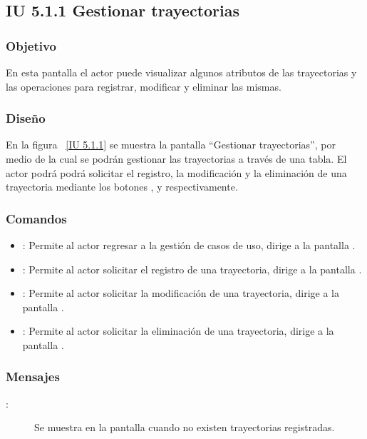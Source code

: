 \newpage 
\subsection{IU 5.1.1 Gestionar trayectorias}
\subsubsection{Objetivo}
	
	En esta pantalla el actor puede visualizar algunos atributos de las trayectorias y las operaciones para registrar, modificar y eliminar las mismas.

\subsubsection{Diseño}

    En la figura ~\ref{IU 5.1.1} se muestra la pantalla ``Gestionar trayectorias'', por medio de la cual 
    se podrán gestionar las trayectorias a través de una tabla.
    El actor podrá podrá solicitar el registro, la modificación y la eliminación de una trayectoria mediante los botones
    , \btnEditar y \btnEliminar respectivamente. \\
    



\subsubsection{Comandos}
\begin{itemize}
	\item {}: Permite al actor regresar a la gestión de casos de uso, dirige a la pantalla .
	\item {}: Permite al actor solicitar el registro de una trayectoria, dirige a la pantalla .
	\item \btnEditar[Modificar]: Permite al actor solicitar la modificación de una trayectoria, dirige a la pantalla .
	\item \btnEliminar[Eliminar]: Permite al actor solicitar la eliminación de una trayectoria, dirige a la pantalla .
\end{itemize}

\subsubsection{Mensajes}

	
\begin{description}
	\item[:] Se muestra en la pantalla  cuando no existen trayectorias registradas.
\end{description}
